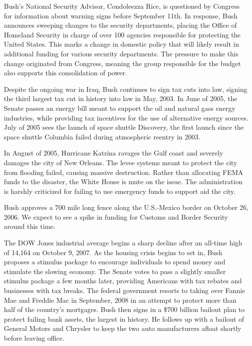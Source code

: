 \documentclass{article}
\begin{document}
        \par
        Bush's National Security Advisor, Condoleezza Rice, is questioned by Congress for information about warning signs before September 11th. In response, Bush announces sweeping changes to the security departments, placing the Office of Homeland Security in charge of over 100 agencies responsible for protecting the United States.\cite{bushevents} This marks a change in domestic policy that will likely result in additional funding for various security departments. The pressure to make this change originated from Congress, meaning the group responsible for the budget also supports this consolidation of power.
        \par
        Despite the ongoing war in Iraq, Bush continues to sign tax cuts into law, signing the third largest tax cut in history into law in May, 2003. In June of 2005, the Senate passes an energy bill meant to support the oil and natural gass energy industries, while providing tax incentives for the use of alternative energy sources. July of 2005 sees the launch of space shuttle Discovery, the first launch since the space shuttle Columbia failed during atmospheric reentry in 2003.\cite{bushevents}
        \par
        In August of 2005, Hurricane Katrina ravages the Gulf coast and severely damages the city of New Orleans. The levee systems meant to protect the city from flooding failed, causing massive destruction. Rather than allocating FEMA funds to the disaster, the White House is mute on the issue. The administration is harshly criticized for failing to use emergency funds to support aid the city.
        \par
        Bush approves a 700 mile long fence along the U.S.-Mexico border on October 26, 2006. We expect to see a spike in funding for Customs and Border Security around this time.
        \par
        The DOW Jones industrial average begins a sharp decline after an all-time high of 14,164 on October 9, 2007. As the housing crisis begins to set in, Bush proposes a stimulus package to encourage individuals to spend money and stimulate the slowing economy. The Senate votes to pass a slightly smaller stimulus package a few months later, providing Americans with tax rebates and businesses with tax breaks. The federal government resorts to taking over Fannie Mae and Freddie Mac in September, 2008 in an attempt to protect more than half of the country's mortgages. Bush then signs in a \$700 billion bailout plan to protect failing bank assets, the largest in history. He follows up with a bailout of General Motors and Chrysler to keep the two auto manufacturers afloat shortly before leaving office. \cite{bushevents}
\end{document}
